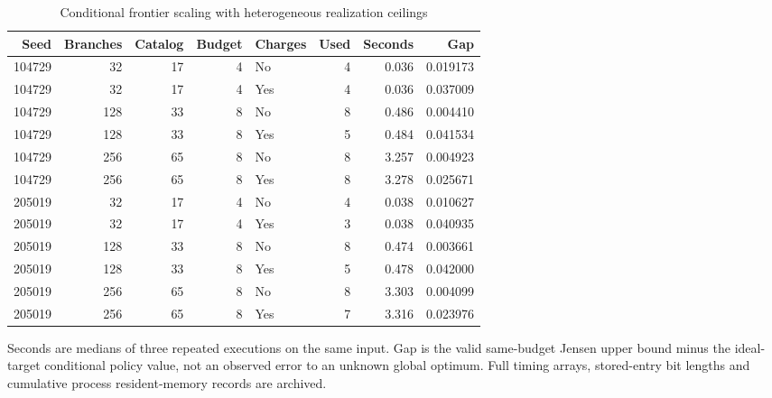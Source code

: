 \begin{table}[p]\centering\small
\caption{Conditional frontier scaling with heterogeneous realization ceilings}\label{tab:r45-scaling}
\begin{tabular}{rrrrlrrr}\toprule
Seed & Branches & Catalog & Budget & Charges & Used & Seconds & Gap \\
\midrule
104729 & 32 & 17 & 4 & No & 4 & 0.036 & 0.019173 \\
104729 & 32 & 17 & 4 & Yes & 4 & 0.036 & 0.037009 \\
104729 & 128 & 33 & 8 & No & 8 & 0.486 & 0.004410 \\
104729 & 128 & 33 & 8 & Yes & 5 & 0.484 & 0.041534 \\
104729 & 256 & 65 & 8 & No & 8 & 3.257 & 0.004923 \\
104729 & 256 & 65 & 8 & Yes & 8 & 3.278 & 0.025671 \\
205019 & 32 & 17 & 4 & No & 4 & 0.038 & 0.010627 \\
205019 & 32 & 17 & 4 & Yes & 3 & 0.038 & 0.040935 \\
205019 & 128 & 33 & 8 & No & 8 & 0.474 & 0.003661 \\
205019 & 128 & 33 & 8 & Yes & 5 & 0.478 & 0.042000 \\
205019 & 256 & 65 & 8 & No & 8 & 3.303 & 0.004099 \\
205019 & 256 & 65 & 8 & Yes & 7 & 3.316 & 0.023976 \\
\bottomrule\end{tabular}
\par\smallskip\begin{minipage}{.98\textwidth}\footnotesize Seconds are medians of three repeated executions on the same input. Gap is the valid same-budget Jensen upper bound minus the ideal-target conditional policy value, not an observed error to an unknown global optimum. Full timing arrays, stored-entry bit lengths and cumulative process resident-memory records are archived.\end{minipage}
\end{table}
